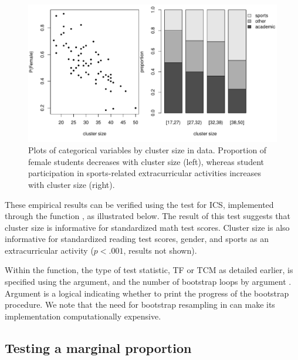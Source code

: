 \begin{figure}[t!]
	\setlength{\fboxsep}{0pt}%
	\setlength{\fboxrule}{0pt}%
	\begin{center}
		\includegraphics[scale=0.5] {GrpbyClSize.pdf}
		\caption{Plots of categorical variables by cluster size in  data. Proportion of female students decreases with cluster size (left), whereas student participation in sports-related extracurricular activities increases with cluster size (right).}
		\label{f:GrpbyClSize}
	\end{center}
\end{figure}
These empirical results can be verified using the test for ICS, implemented through the function , as illustrated below. The result of this test suggests that cluster size is informative for standardized math test scores. Cluster size is also informative for standardized reading test scores, gender, and sports as an extracurricular activity ($p < .001$, results not shown). 
Within the  function, the type of test statistic, TF or TCM as detailed earlier, is specified using the  argument, and the number of bootstrap loops by argument .  Argument  is a logical indicating whether to print the progress of the bootstrap procedure. We note that the need for bootstrap resampling in  can make its implementation computationally expensive.

\subsection[Marginal proportion test]{Testing a marginal proportion} \label{ss:proptest}

